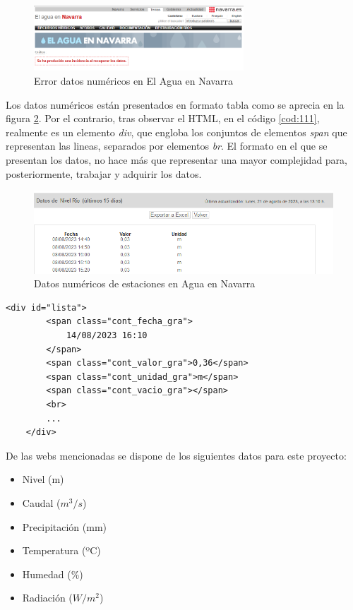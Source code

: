 \begin{figure} [H]
	\centering
	\includegraphics[width=0.7\textwidth]{fig/ErrorAguaEnNavarra.png}
	\caption[Error al cargar directamente la página de datos numéricos en El Agua en Navarra]{Error datos numéricos en El Agua en Navarra}
	\label{fig:ej5}
\end{figure}

Los datos numéricos están presentados en formato tabla como se aprecia en la figura \ref{fig:ej26}. Por el contrario, tras observar el HTML, en el código \ref{cod:111}, realmente es un elemento \textit{div}, que engloba los conjuntos de elementos \textit{span} que representan las lineas, separados por elementos \textit{br}. El formato en el que se presentan los datos, no hace más que representar una mayor complejidad para, posteriormente, trabajar y adquirir los datos. 

\begin{figure} [H]
	\centering
	\includegraphics[width=.8\linewidth]{fig/AguaEnNavarraData.png}
	\caption{Datos numéricos de estaciones en Agua en Navarra}
	\label{fig:ej26}
\end{figure}

\begin{lstlisting}[basicstyle=\footnotesize, caption={HTML datos en El Agua en Navarra}, label=cod:111]
	<div id="lista">	                
		<span class="cont_fecha_gra">
			14/08/2023 16:10
		</span>
		<span class="cont_valor_gra">0,36</span>
		<span class="cont_unidad_gra">m</span>
		<span class="cont_vacio_gra"></span>
		<br>
		...
	</div>
\end{lstlisting}

De las webs mencionadas se dispone de los siguientes datos para este proyecto:

\begin{itemize}
	\setlength\itemsep{0.5em}
	\item Nivel (m)
	\item Caudal ($m^3/s$)
	\item Precipitación (mm)
	\item Temperatura (ºC)
	\item Humedad (\%)
	\item Radiación ($W/m^2$)
\end{itemize}


